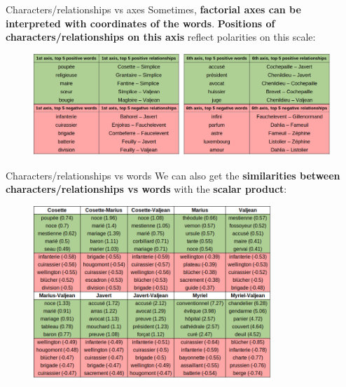 \documentclass[10pt]{beamer}
\newcommand{\imp}[1]{\textbf{\color{cyan}#1}}
\begin{document}
	\begin{frame}{Characters/relationships vs axes}
		Sometimes, \imp{factorial axes can be interpreted with coordinates of the words}. \imp{Positions of characters/relationships on this axis} reflect polarities on this scale:
		\begin{figure}
			\centering
			\includegraphics[width=\textwidth]{img/relationship_vs_axes.png}
		\end{figure}
	\end{frame}
	
	
	\begin{frame}{Characters/relationships vs words}
		We can also get the \imp{similarities between characters/relationships vs words} with the \imp{scalar product}:
		\begin{figure}
			\centering
			\includegraphics[width=0.8\textwidth]{img/relationships_vs_words.png}
		\end{figure}
	\end{frame}
	
	
\end{document}
